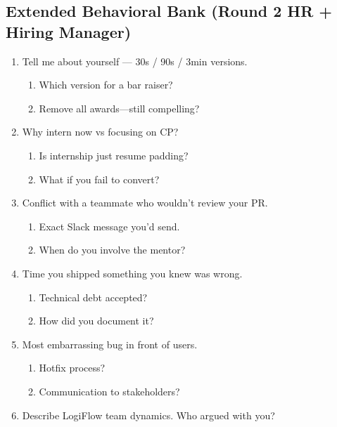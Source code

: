 \documentclass[9pt,a4paper]{article}
\begin{document}
\subsection{Extended Behavioral Bank (Round 2 HR + Hiring Manager)}
\begin{enumerate}[label=\textbf{Q\arabic*:}, leftmargin=*]
  \item Tell me about yourself --- 30s / 90s / 3min versions.
  \begin{enumerate}[label=\textit{FU\arabic*:}, leftmargin=2em]
    \item Which version for a bar raiser?
    \item Remove all awards---still compelling?
  \end{enumerate}
  \item Why intern now vs focusing on CP?
  \begin{enumerate}[label=\textit{FU\arabic*:}, leftmargin=2em]
    \item Is internship just resume padding?
    \item What if you fail to convert?
  \end{enumerate}
  \item Conflict with a teammate who wouldn't review your PR.
  \begin{enumerate}[label=\textit{FU\arabic*:}, leftmargin=2em]
    \item Exact Slack message you'd send.
    \item When do you involve the mentor?
  \end{enumerate}
  \item Time you shipped something you knew was wrong.
  \begin{enumerate}[label=\textit{FU\arabic*:}, leftmargin=2em]
    \item Technical debt accepted?
    \item How did you document it?
  \end{enumerate}
  \item Most embarrassing bug in front of users.
  \begin{enumerate}[label=\textit{FU\arabic*:}, leftmargin=2em]
    \item Hotfix process?
    \item Communication to stakeholders?
  \end{enumerate}
  \item Describe LogiFlow team dynamics. Who argued with you?
  \begin{enumerate}[label=\textit{FU\arabic*:}, leftmargin=2em]

\end{enumerate}
\end{enumerate}
\end{document}
